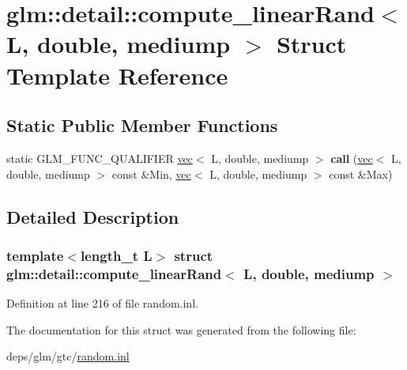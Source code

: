 \hypertarget{structglm_1_1detail_1_1compute__linearRand_3_01L_00_01double_00_01mediump_01_4}{}\section{glm\+:\+:detail\+:\+:compute\+\_\+linear\+Rand$<$ L, double, mediump $>$ Struct Template Reference}
\label{structglm_1_1detail_1_1compute__linearRand_3_01L_00_01double_00_01mediump_01_4}
\subsection*{Static Public Member Functions}
\begin{DoxyCompactItemize}
\item 
\mbox{\label{structglm_1_1detail_1_1compute__linearRand_3_01L_00_01double_00_01mediump_01_4_a08d90fcede38457000e8dec6f72b9ece}} 
static G\+L\+M\+\_\+\+F\+U\+N\+C\+\_\+\+Q\+U\+A\+L\+I\+F\+I\+ER \hyperlink{structglm_1_1vec}{vec}$<$ L, double, mediump $>$ {\bfseries call} (\hyperlink{structglm_1_1vec}{vec}$<$ L, double, mediump $>$ const \&Min, \hyperlink{structglm_1_1vec}{vec}$<$ L, double, mediump $>$ const \&Max)
\end{DoxyCompactItemize}


\subsection{Detailed Description}
\subsubsection*{template$<$length\+\_\+t L$>$\newline
struct glm\+::detail\+::compute\+\_\+linear\+Rand$<$ L, double, mediump $>$}



Definition at line 216 of file random.\+inl.



The documentation for this struct was generated from the following file\+:\begin{DoxyCompactItemize}
\item 
deps/glm/gtc/\hyperlink{random_8inl}{random.\+inl}\end{DoxyCompactItemize}
